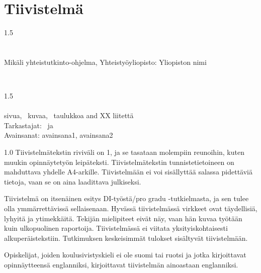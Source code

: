\section*{Tiivistelmä}
\begin{otherlanguage}{finnish}
\begin{spacing}{1.5}
\universityFIN\\
\schoolFIN\\
\degreeprogrammeFIN\\
Mikäli yhteistutkinto-ohjelma, Yhteistyöyliopisto: Yliopiston nimi
\end{spacing}

\myname

\textbf{\mytitleFIN}\\
\mysubtitleFIN

\begin{spacing}{1.5}
\thesistypeFIN\\
\thesisyear\\
\pageref{myLastPage} sivua, \totalfigures~kuvaa, \totaltables~taulukkoa and XX liitettä\\
Tarkastajat: \examinerAFIN~ja \examinerBFIN\\
Avainsanat: avainsana1, avainsana2
\end{spacing}

\vspace{1em}
\begin{spacing}{1.0}
Tiivistelmätekstin riviväli on 1, ja se tasataan molempiin reunoihin, kuten muukin opinnäytetyön leipäteksti. Tiivistelmätekstin tunnistetietoineen on mahduttava yhdelle A4-arkille. Tiivistelmään ei voi sisällyttää salassa pidettäviä tietoja, vaan se on aina laadittava julkiseksi.

Tiivistelmä on itsenäinen esitys DI-työstä/pro gradu -tutkielmasta, ja sen tulee olla ymmärrettävissä sellaisenaan. Hyvässä tiivistelmässä virkkeet ovat täydellisiä, lyhyitä ja ytimekkäitä. Tekijän mielipiteet eivät näy, vaan hän kuvaa työtään kuin ulkopuolinen raportoija. Tiivistelmässä ei viitata yksityiskohtaisesti alkuperäistekstiin. Tutkimuksen keskeisimmät tulokset sisältyvät tiivistelmään.

Opiskelijat, joiden koulusivistyskieli ei ole suomi tai ruotsi ja jotka kirjoittavat opinnäytteensä englanniksi, kirjoittavat tiivistelmän ainoastaan englanniksi.
\end{spacing}
\end{otherlanguage}
\clearpage %
